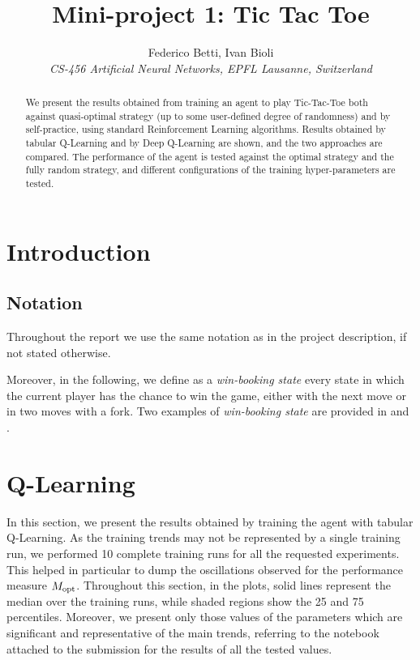 \documentclass[10pt]{IEEEtran}
\begin{document}
\title{Mini-project 1: Tic Tac Toe}

\author{
   Federico Betti, Ivan Bioli\\
  \textit{CS-456 Artificial Neural Networks, EPFL Lausanne, Switzerland}
}



\maketitle

\begin{abstract}
We present the results obtained from training an agent to play Tic-Tac-Toe both against quasi-optimal strategy (up to some user-defined degree of randomness) and by self-practice, using standard Reinforcement Learning algorithms. Results obtained by tabular Q-Learning and by Deep Q-Learning are shown, and the two approaches are compared. The performance of the agent is tested against the optimal strategy and the fully random strategy, and different configurations of the training hyper-parameters are tested. 
\end{abstract}

\section{Introduction}
\subsection{Notation}
Throughout the report we use the same notation as in the project description, if not stated otherwise.

Moreover, in the following, we define as a \emph{win-booking state} every state in which the current player has the chance to win the game, either with the next move or in two moves with a fork. Two examples of \emph{win-booking state} are provided in  and .

\section{Q-Learning}
In this section, we present the results obtained by training the agent with tabular Q-Learning. As the training trends may not be represented by a single training run, we performed 10 complete training runs for all the requested experiments. This helped in particular to dump the oscillations observed for the performance measure $M_{\text{opt}}$. Throughout this section, in the plots, solid lines represent the median over the training runs, while shaded regions show the 25 and 75 percentiles. Moreover, we present only those values of the parameters which are significant and representative of the main trends, referring to the notebook attached to the submission for the results of all the tested values.
\end{document}
